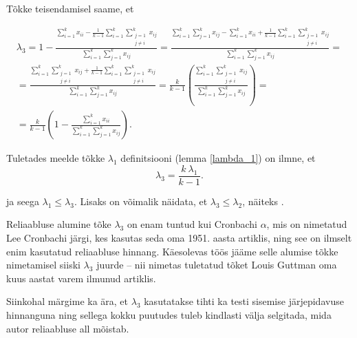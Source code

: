 \documentclass[a4paper,12pt,oneside]{article}
\newcounter{lemma}[section]
\numberwithin{equation}{section}
\theoremstyle{definition}
\begin{document}
Tõkke teisendamisel saame, et

\begin{equation*}
\begin{gathered}
\lambda_3 = 1 - \frac{\sum \limits_{i=1}^k x_{ii} -  \frac{1}{k - 1} \sum \limits_{i=1}^k   \sum \limits_{\substack{j=1 \\ j \neq i}}^{k} x_{ij} }{\sum \limits_{i=1}^k \sum \limits_{j=1}^k x_{ij}} 
= \frac{\sum \limits_{i=1}^k \sum \limits_{j=1}^k x_{ij} - \sum \limits_{i=1}^k x_{ii} +  \frac{1}{k - 1} \sum \limits_{i=1}^k   \sum \limits_{\substack{j=1 \\ j \neq i}}^{k} x_{ij} }{\sum \limits_{i=1}^k \sum \limits_{j=1}^k x_{ij}} = \\
= \frac{\sum \limits_{i=1}^k   \sum \limits_{\substack{j=1 \\ j \neq i}}^{k} x_{ij}  +  \frac{1}{k - 1} \sum \limits_{i=1}^k   \sum \limits_{\substack{j=1 \\ j \neq i}}^{k} x_{ij} }{\sum \limits_{i=1}^k \sum \limits_{j=1}^k x_{ij}} 
= \frac{k}{k-1} \left( \frac{\sum \limits_{i=1}^k \sum \limits_{\substack{j=1 \\ j \neq i}}^{k} x_{ij} }{\sum \limits_{i=1}^k \sum \limits_{j=1}^k x_{ij}} \right) = \\
= \frac{k}{k-1} \left(1 - \frac{\sum \limits_{i=1}^k x_{ii}}{\sum \limits_{i=1}^k \sum \limits_{j=1}^k x_{ij}} \right).
\end{gathered}
\end{equation*}

Tuletades meelde tõkke $\lambda_1$ definitsiooni (lemma \ref{lambda_1}) on ilmne, et
\begin{equation}
\label{eq:lambda_3_from_lambda_1}
\lambda_3 = \frac{k\ \lambda_1}{k-1}.
\end{equation}

ja seega $\lambda_1 \leq \lambda_3$. Lisaks on võimalik näidata, et $\lambda_3 \leq \lambda_2$, näiteks \cite[148-149]{Revelle2008}.


Reliaabluse alumine tõke $\lambda_3$ on enam tuntud kui Cronbachi $\alpha$, mis on nimetatud Lee Cronbachi järgi, kes kasutas seda oma 1951. aasta artiklis\cite{Cronbach1951}, ning see on ilmselt enim kasutatud reliaabluse hinnang. Käesolevas töös jääme  selle alumise tõkke nimetamisel siiski $\lambda_3$ juurde -- nii nimetas tuletatud tõket Louis Guttman oma kuus aastat varem ilmunud artiklis\cite{Guttman1945}.

Siinkohal märgime ka ära, et $\lambda_3$ kasutatakse tihti ka  testi sisemise järjepidavuse hinnanguna ning sellega kokku puutudes tuleb kindlasti välja selgitada, mida autor reliaabluse all mõistab.
\end{document}
